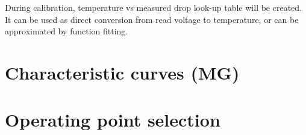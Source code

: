         During calibration, temperature vs measured drop look-up table will be created. It can be used as direct conversion from read voltage to temperature, or can be approximated by function fitting.

\section{Characteristic curves (MG)}
\label{Characteristic_curves}

\section{Operating point selection}
